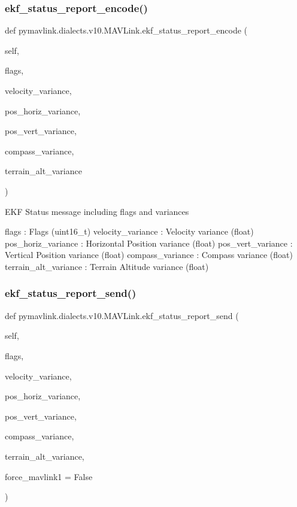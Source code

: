 \begin{DoxyVerb}
\begin{DoxyVerb}
\subsubsection{\texorpdfstring{ekf\+\_\+status\+\_\+report\+\_\+encode()}{ekf\_status\_report\_encode()}}
{\footnotesize\ttfamily def pymavlink.\+dialects.\+v10.\+M\+A\+V\+Link.\+ekf\+\_\+status\+\_\+report\+\_\+encode (\begin{DoxyParamCaption}\item[{}]{self,  }\item[{}]{flags,  }\item[{}]{velocity\+\_\+variance,  }\item[{}]{pos\+\_\+horiz\+\_\+variance,  }\item[{}]{pos\+\_\+vert\+\_\+variance,  }\item[{}]{compass\+\_\+variance,  }\item[{}]{terrain\+\_\+alt\+\_\+variance }\end{DoxyParamCaption})}

\begin{DoxyVerb}EKF Status message including flags and variances

flags                     : Flags (uint16_t)
velocity_variance         : Velocity variance (float)
pos_horiz_variance        : Horizontal Position variance (float)
pos_vert_variance         : Vertical Position variance (float)
compass_variance          : Compass variance (float)
terrain_alt_variance        : Terrain Altitude variance (float)\end{DoxyVerb}
 \mbox{\label{classpymavlink_1_1dialects_1_1v10_1_1MAVLink_a328f8995f6ebd14f922f6fb656c3f71c}} 
\subsubsection{\texorpdfstring{ekf\+\_\+status\+\_\+report\+\_\+send()}{ekf\_status\_report\_send()}}
{\footnotesize\ttfamily def pymavlink.\+dialects.\+v10.\+M\+A\+V\+Link.\+ekf\+\_\+status\+\_\+report\+\_\+send (\begin{DoxyParamCaption}\item[{}]{self,  }\item[{}]{flags,  }\item[{}]{velocity\+\_\+variance,  }\item[{}]{pos\+\_\+horiz\+\_\+variance,  }\item[{}]{pos\+\_\+vert\+\_\+variance,  }\item[{}]{compass\+\_\+variance,  }\item[{}]{terrain\+\_\+alt\+\_\+variance,  }\item[{}]{force\+\_\+mavlink1 = {\ttfamily False} }\end{DoxyParamCaption})}


\end{DoxyVerb}
\end{DoxyVerb}
